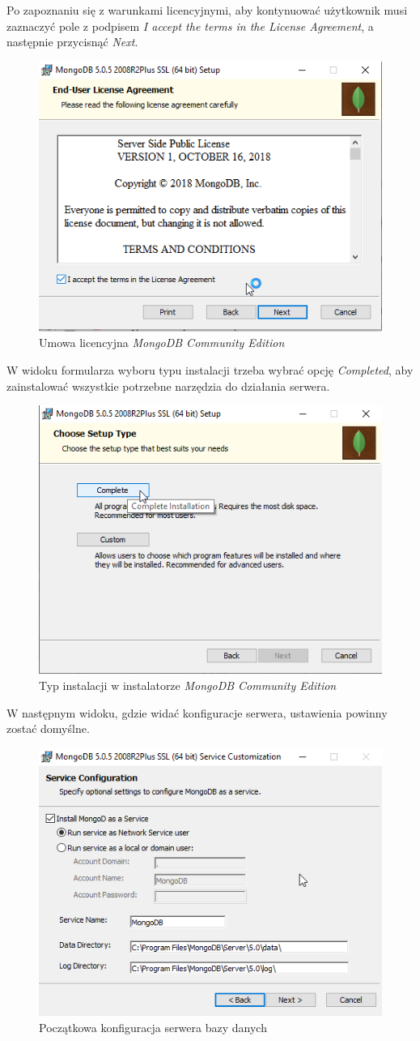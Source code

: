 \documentclass[a4paper,twoside,12pt]{book}
\begin{document}
{\newpage
Po zapoznaniu się z warunkami licencyjnymi, aby kontynuować użytkownik musi zaznaczyć pole z podpisem \textit{I accept the terms in the License Agreement}, a następnie przycisnąć \textit{Next}.
\begin{figure}[h!]
	\centering
	\includegraphics[width=0.65\linewidth]{../zrzuty_ekranu/instalcja_mongodb/mongodb2}
	\caption{Umowa licencyjna \textit{MongoDB Community Edition}}
	\label{fig:mongodb2}
\end{figure}
\FloatBarrier

W widoku formularza wyboru typu instalacji trzeba wybrać opcję \textit{Completed}, aby zainstalować wszystkie potrzebne narzędzia do działania serwera.
\begin{figure}[h!]
	\centering
	\includegraphics[width=0.6\linewidth]{../zrzuty_ekranu/instalcja_mongodb/mongodb3}
	\caption{Typ instalacji w instalatorze \textit{MongoDB Community Edition}}
	\label{fig:mongodb3}
\end{figure}
\FloatBarrier

W następnym widoku, gdzie widać konfiguracje serwera, ustawienia powinny zostać domyślne.
\begin{figure}[h!]
	\centering
	\includegraphics[width=0.6\linewidth]{../zrzuty_ekranu/instalcja_mongodb/mongodb4}
	\caption{Początkowa konfiguracja serwera bazy danych}
	\label{fig:mongodb4}
\end{figure}
\FloatBarrier

}
\end{document}
